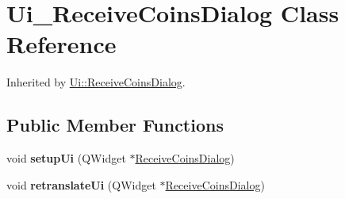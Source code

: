 \hypertarget{class_ui___receive_coins_dialog}{}\section{Ui\+\_\+\+Receive\+Coins\+Dialog Class Reference}
\label{class_ui___receive_coins_dialog}


Inherited by \mbox{\hyperlink{class_ui_1_1_receive_coins_dialog}{Ui\+::\+Receive\+Coins\+Dialog}}.

\subsection*{Public Member Functions}
\begin{DoxyCompactItemize}
\item 
\mbox{\label{class_ui___receive_coins_dialog_a990cf54ed517108599c0fc1e97fb4288}} 
void {\bfseries setup\+Ui} (Q\+Widget $\ast$\mbox{\hyperlink{class_receive_coins_dialog}{Receive\+Coins\+Dialog}})
\item 
\mbox{\label{class_ui___receive_coins_dialog_ab8ec986ddacb3e597797189ff26a3de2}} 
void {\bfseries retranslate\+Ui} (Q\+Widget $\ast$\mbox{\hyperlink{class_receive_coins_dialog}{Receive\+Coins\+Dialog}})
\end{DoxyCompactItemize}
